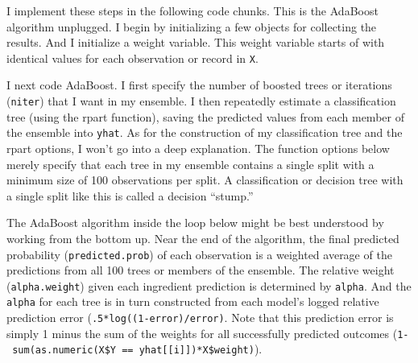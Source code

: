 \documentclass[]{tufte-handout}
\newenvironment{Shaded}{}{}
\newcommand{\KeywordTok}[1]{\textcolor[rgb]{0.00,0.44,0.13}{\textbf{#1}}}
\newcommand{\DecValTok}[1]{\textcolor[rgb]{0.25,0.63,0.44}{#1}}
\newcommand{\StringTok}[1]{\textcolor[rgb]{0.25,0.44,0.63}{#1}}
\newcommand{\CommentTok}[1]{\textcolor[rgb]{0.38,0.63,0.69}{\textit{#1}}}
\newcommand{\OperatorTok}[1]{\textcolor[rgb]{0.40,0.40,0.40}{#1}}
\newcommand{\NormalTok}[1]{#1}
\begin{document}
I implement these steps in the following code chunks. This is the
AdaBoost algorithm unplugged. I begin by initializing a few objects for
collecting the results. And I initialize a weight variable. This weight
variable starts of with identical values for each observation or record
in \texttt{X}.

\begin{Shaded}
\end{Shaded}

I next code AdaBoost. I first specify the number of boosted trees or
iterations (\texttt{niter}) that I want in my ensemble. I then
repeatedly estimate a classification tree (using the rpart function),
saving the predicted values from each member of the ensemble into
\texttt{yhat}. As for the construction of my classification tree and the
rpart options, I won't go into a deep explanation. The function options
below merely specify that each tree in my ensemble contains a single
split with a minimum size of 100 observations per split. A
classification or decision tree with a single split like this is called
a decision ``stump.''

The AdaBoost algorithm inside the loop below might be best understood by
working from the bottom up. Near the end of the algorithm, the final
predicted probability (\texttt{predicted.prob}) of each observation is a
weighted average of the predictions from all 100 trees or members of the
ensemble. The relative weight (\texttt{alpha.weight}) given each
ingredient prediction is determined by \texttt{alpha}. And the
\texttt{alpha} for each tree is in turn constructed from each model's
logged relative prediction error (\texttt{.5*log((1-error)/error)}. Note
that this prediction error is simply 1 minus the sum of the weights for
all successfully predicted outcomes
(\texttt{1-\ sum(as.numeric(X\$Y\ ==\ yhat{[}{[}i{]}{]})*X\$weight)}).
\end{document}
